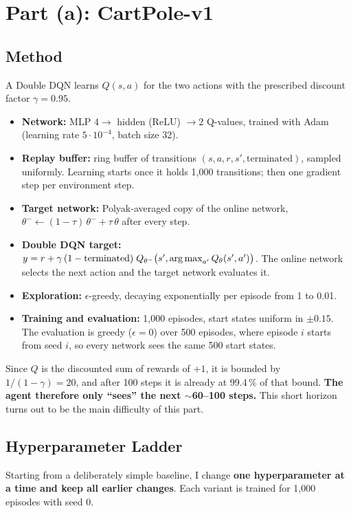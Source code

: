 \section{Part (a): CartPole-v1}
\label{sec:cartpole}

\subsection{Method}

A Double DQN learns $Q(s, a)$ for the two actions with the prescribed discount factor $\gamma = 0.95$.
\begin{itemize}
  \item \textbf{Network:} MLP $4 \to$ hidden (ReLU) $\to 2$ Q-values, trained with Adam (learning rate $5 \cdot 10^{-4}$, batch size 32).
  \item \textbf{Replay buffer:} ring buffer of transitions $(s, a, r, s', \text{terminated})$, sampled uniformly. Learning starts once it holds 1,000 transitions; then one gradient step per environment step.
  \item \textbf{Target network:} Polyak-averaged copy of the online network, $\theta^- \leftarrow (1-\tau)\,\theta^- + \tau\,\theta$ after every step.
  \item \textbf{Double DQN target:} $y = r + \gamma\,(1 - \text{terminated})\; Q_{\theta^-}\big(s', \operatorname*{arg\,max}_{a'} Q_\theta(s', a')\big)$. The online network selects the next action and the target network evaluates it.
  \item \textbf{Exploration:} $\epsilon$-greedy, decaying exponentially per episode from 1 to 0.01.
  \item \textbf{Training and evaluation:} 1,000 episodes, start states uniform in $\pm 0.15$. The evaluation is greedy ($\epsilon = 0$) over 500 episodes, where episode $i$ starts from seed $i$, so every network sees the same 500 start states.
\end{itemize}

Since $Q$ is the discounted sum of rewards of $+1$, it is bounded by $1/(1-\gamma) = 20$, and after 100 steps it is already at 99.4\,\% of that bound. \textbf{The agent therefore only ``sees'' the next $\sim$60--100 steps.} This short horizon turns out to be the main difficulty of this part.

\subsection{Hyperparameter Ladder}

Starting from a deliberately simple baseline, I change \textbf{one hyperparameter at a time and keep all earlier changes}. Each variant is trained for 1,000 episodes with seed 0.

